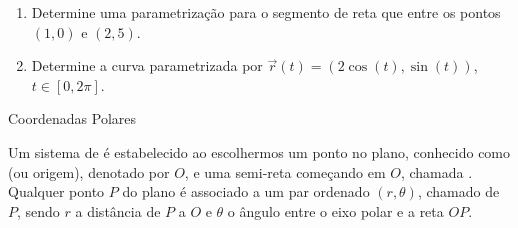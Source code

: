 \begin{frame}[label=fun-vet]
	\begin{casa}
		\begin{enumerate}
			\item  Determine uma parametrização para o segmento de reta que entre os pontos $(1,0)$ e $(2,5)$.
			\item Determine a curva parametrizada por $\vec{r}(t)=(2\cos(t),\sin(t))$, $t\in [0,2\pi]$.
		\end{enumerate}
	\end{casa}
\end{frame}




\begin{frame}[label=fun-vet]{Coordenadas Polares}

		Um sistema de  é estabelecido ao escolhermos um ponto no plano, conhecido como  (ou origem), denotado por $O$, e uma semi-reta começando em $O$, chamada . Qualquer ponto $P$ do plano é associado a um par ordenado $(r,\theta)$, chamado  de $P$, sendo $r$ a distância de $P$ a $O$ e $\theta$ o ângulo entre o eixo polar e a reta $OP$.
		\medskip

\centering
{}


		\end{frame}
		

